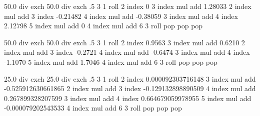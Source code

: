   {\pgfpoint{-50bp}{-50bp}}
  {\pgfpoint{50bp}{50bp}}{}{
  50.0 div exch
  50.0 div exch
  .5
  3 1 roll %
  2 index 0 3 index mul add 1.28033 2 index mul add %
  3 index -0.21482 4 index mul add -0.38059 3 index mul add %
  4 index 2.12798 5 index mul add 0 4 index mul add %
  6 3 roll pop pop pop
}

  {\pgfpoint{-50bp}{-50bp}}
  {\pgfpoint{50bp}{50bp}}{}{
  50.0 div exch
  50.0 div exch
  .5
  3 1 roll %
  2 index 0.9563 3 index mul add 0.6210 2 index mul add %
  3 index -0.2721 4 index mul add -0.6474 3 index mul add %
  4 index -1.1070 5 index mul add 1.7046 4 index mul add %
  6 3 roll pop pop pop
}

  {\pgfpoint{-50bp}{-50bp}}
  {\pgfpoint{50bp}{50bp}}{}{
  25.0 div exch
  25.0 div exch
  .5
  3 1 roll %
  2 index 0.000092303716148 3 index mul add -0.525912630661865 2 index mul add %
  3 index -0.129132898890509 4 index mul add 0.267899328207599 3 index mul add %
  4 index 0.664679059978955 5 index mul add -0.000079202543533 4 index mul add %
  6 3 roll pop pop pop
}

